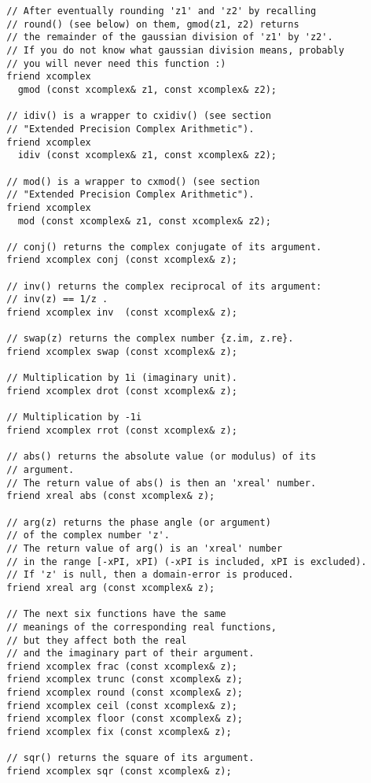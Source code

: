 \documentclass{article}
\begin{document}
\begin{verbatim}
  // After eventually rounding 'z1' and 'z2' by recalling
  // round() (see below) on them, gmod(z1, z2) returns
  // the remainder of the gaussian division of 'z1' by 'z2'.
  // If you do not know what gaussian division means, probably
  // you will never need this function :)
  friend xcomplex 
    gmod (const xcomplex& z1, const xcomplex& z2);

  // idiv() is a wrapper to cxidiv() (see section 
  // "Extended Precision Complex Arithmetic").
  friend xcomplex 
    idiv (const xcomplex& z1, const xcomplex& z2);

  // mod() is a wrapper to cxmod() (see section 
  // "Extended Precision Complex Arithmetic").
  friend xcomplex 
    mod (const xcomplex& z1, const xcomplex& z2);

  // conj() returns the complex conjugate of its argument.
  friend xcomplex conj (const xcomplex& z);

  // inv() returns the complex reciprocal of its argument:
  // inv(z) == 1/z .
  friend xcomplex inv  (const xcomplex& z);

  // swap(z) returns the complex number {z.im, z.re}.
  friend xcomplex swap (const xcomplex& z);

  // Multiplication by 1i (imaginary unit). 
  friend xcomplex drot (const xcomplex& z);

  // Multiplication by -1i
  friend xcomplex rrot (const xcomplex& z);

  // abs() returns the absolute value (or modulus) of its
  // argument.
  // The return value of abs() is then an 'xreal' number.
  friend xreal abs (const xcomplex& z);

  // arg(z) returns the phase angle (or argument)
  // of the complex number 'z'.
  // The return value of arg() is an 'xreal' number
  // in the range [-xPI, xPI) (-xPI is included, xPI is excluded).
  // If 'z' is null, then a domain-error is produced.
  friend xreal arg (const xcomplex& z);

  // The next six functions have the same
  // meanings of the corresponding real functions,
  // but they affect both the real
  // and the imaginary part of their argument.
  friend xcomplex frac (const xcomplex& z);
  friend xcomplex trunc (const xcomplex& z);
  friend xcomplex round (const xcomplex& z);
  friend xcomplex ceil (const xcomplex& z);
  friend xcomplex floor (const xcomplex& z);
  friend xcomplex fix (const xcomplex& z);

  // sqr() returns the square of its argument.
  friend xcomplex sqr (const xcomplex& z);


\end{verbatim}
\end{document}
